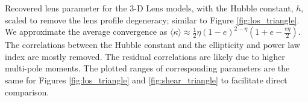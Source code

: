 \label{fig:scaled_triangle} Recovered lens parameter for the 3-D Lens models, with the Hubble constant, $h$, scaled to remove the lens profile degeneracy; similar to Figure \ref{fig:los_triangle}. We approximate the average convergence as $\langle \kappa \rangle \approx \frac{1}{2} \eta  (1 - e)^{2 - \eta} \left(1 +  e - \frac{e \eta }{2}\right).$ The correlations between the Hubble constant and the ellipticity and power law index are mostly removed. The residual correlations are likely due to higher multi-pole moments. The plotted ranges of corresponding parameters are the same for Figures \ref{fig:los_triangle} and \ref{fig:shear_triangle} to facilitate direct comparison.